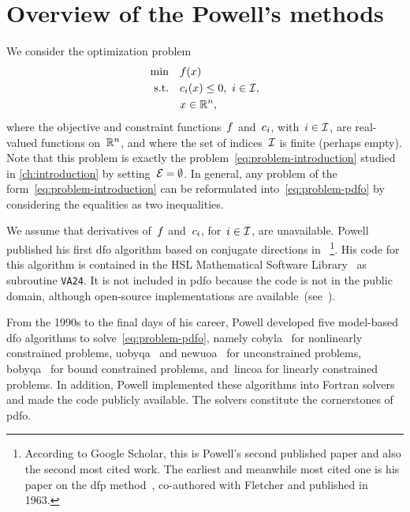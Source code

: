
\section{Overview of the Powell's  methods}
\label{sec:powell}

We consider the optimization problem
\begin{subequations}
    \label{eq:problem-pdfo}
    \begin{align}
        \min        & \quad \obj(\iter)\\
        \text{s.t.} & \quad \con{i}(\iter) \le 0, ~ i \in \iub,\\
                    & \quad \iter \in \R^n, \nonumber
    \end{align}
\end{subequations}
where the objective and constraint functions~$f$ and~$c_{i}$, with~$i \in \mathcal{I}$, are real-valued functions on~$\mathbb{R}^n$, and where the set of indices~$\mathcal{I}$ is finite (perhaps empty).
Note that this problem is exactly the problem~\cref{eq:problem-introduction} studied in \cref{ch:introduction} by setting~$\mathcal{E} = \emptyset$.
In general, any problem of the form~\cref{eq:problem-introduction} can be reformulated into~\cref{eq:problem-pdfo} by considering the equalities as two inequalities.

We assume that derivatives of~$f$ and~$c_{i}$, for~$i \in \mathcal{I}$, are unavailable.
Powell published his first \gls{dfo} algorithm based on conjugate directions in \citeyear{Powell_1964}~\cite{Powell_1964}\footnote{According to Google Scholar, this is Powell's second published paper and also the second most cited work. The earliest and meanwhile most cited one is his paper on the \gls{dfp} method~\cite{Fletcher_Powell_1963}, co-authored with Fletcher and published in 1963.}.
His code for this algorithm is contained in the HSL Mathematical Software Library~\cite{HSL} as subroutine \texttt{VA24}.
It is not included in \gls{pdfo} because the code is not in the public domain, although open-source implementations are available~(see~\cite[Fn.~4]{Conn_Scheinberg_Toint_1997b}).

From the 1990s to the final days of his career, Powell developed five model-based \gls{dfo} algorithms to solve~\cref{eq:problem-pdfo}, namely \gls{cobyla}~\cite{Powell_1994} for nonlinearly constrained problems, \gls{uobyqa}~\cite{Powell_2002} and \gls{newuoa}~\cite{Powell_2006} for unconstrained problems, \gls{bobyqa}~\cite{Powell_2009} for bound constrained problems, and~\gls{lincoa} for linearly constrained problems.
In addition, Powell implemented these algorithms into Fortran solvers and made
the code publicly available.
The solvers constitute the cornerstones of \gls{pdfo}.

